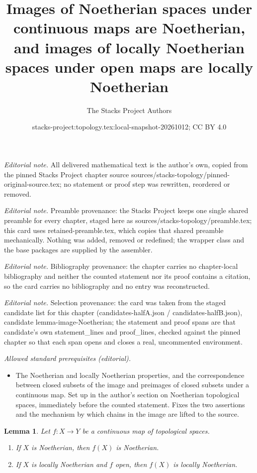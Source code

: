 \documentclass[10pt,a4paper]{amsart}
\title{Images of Noetherian spaces under continuous maps are Noetherian, and images of locally Noetherian spaces under open maps are locally Noetherian}
\author{The Stacks Project Authors}
\date{stacks-project:topology.tex:local-snapshot-20261012; CC BY 4.0}
\theoremstyle{plain}
\newtheorem{lemma}[subsection]{Lemma}
\theoremstyle{definition}
\theoremstyle{remark}
\numberwithin{equation}{subsection}
\begin{document}
\maketitle
\noindent\textit{Editorial note.} All delivered mathematical text is the author's own, copied from the pinned Stacks Project chapter source sources/stacks-topology/pinned-original-source.tex; no statement or proof step was rewritten, reordered or removed.\par\medskip
\noindent\textit{Editorial note.} Preamble provenance: the Stacks Project keeps one single shared preamble for every chapter, staged here as sources/stacks-topology/preamble.tex; this card uses retained-preamble.tex, which copies that shared preamble mechanically. Nothing was added, removed or redefined; the wrapper class and the base packages are supplied by the assembler.\par\medskip
\noindent\textit{Editorial note.} Bibliography provenance: the chapter carries no chapter-local bibliography and neither the counted statement nor its proof contains a citation, so the card carries no bibliography and no entry was reconstructed.\par\medskip
\noindent\textit{Editorial note.} Selection provenance: the card was taken from the staged candidate list for this chapter (candidates-halfA.json / candidates-halfB.json), candidate lemma-image-Noetherian; the statement and proof spans are that candidate's own statement\_lines and proof\_lines, checked against the pinned chapter so that each span opens and closes a real, uncommented environment.\par\medskip
\noindent\textit{Allowed standard prerequisites (editorial).}\begin{itemize}
\item The Noetherian and locally Noetherian properties, and the correspondence between closed subsets of the image and preimages of closed subsets under a continuous map. Set up in the author's section on Noetherian topological spaces, immediately before the counted statement. Fixes the two assertions and the mechanism by which chains in the image are lifted to the source.
\end{itemize}\medskip
\begin{lemma}
\label{lemma-image-Noetherian}
Let $f : X \to Y$ be a continuous map of topological spaces.
\begin{enumerate}
\item If $X$ is Noetherian, then $f(X)$ is Noetherian.
\item If $X$ is locally Noetherian and $f$ open, then $f(X)$ is
locally Noetherian.
\end{enumerate}
\end{lemma}
\end{document}
